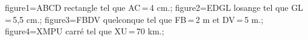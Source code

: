 \documentclass[exercice]{thedocument}%
\begin{document}
%
    \>figure1=ABCD rectangle tel que AC\,=\,4 cm.;%
    \>figure2=EDGL losange tel que GL\,=\,5,5 cm.;%
    \>figure3=FBDV quelconque tel que FB\,=\,2 m et DV\,=\,5 m.;%
    \>figure4=XMPU carré tel que XU\,=\,70 km.;%
\end{document}

